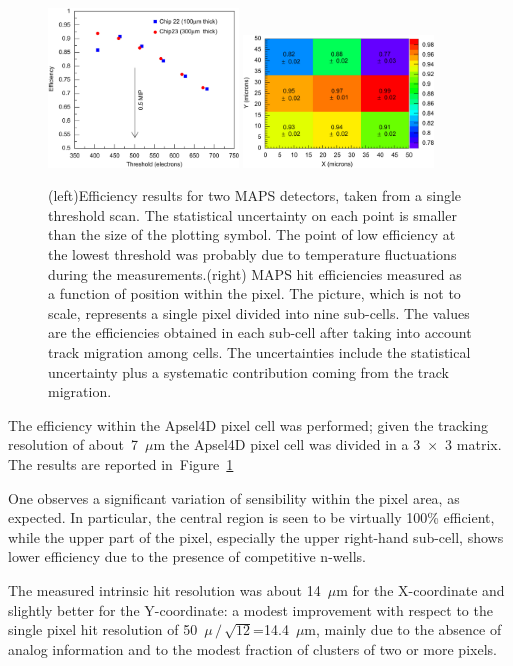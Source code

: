 \begin{figure}[!htpb]
\centering
\includegraphics[width=0.45\textwidth]{maps_eff.jpg}
\includegraphics[width=0.45\textwidth]{maps_res.jpg}
\caption{\label{fig:maps_eff}(left)Efficiency results for two MAPS detectors, taken from a single threshold 
scan. The statistical uncertainty on each point is smaller than the size of the plotting symbol. The point 
of low efficiency at the lowest threshold was probably due to temperature fluctuations during the 
measurements.(right) MAPS hit efficiencies measured as a function of position within the pixel. The picture, which is not to scale, represents a single pixel divided into nine sub-cells. The values are the efficiencies obtained in each sub-cell after taking into account track migration among cells. The uncertainties include the statistical uncertainty plus a systematic contribution coming from the track migration.}
\end{figure}
The efficiency within the Apsel4D pixel cell was performed; given the tracking resolution 
of about~7~$\mu$m the Apsel4D pixel cell was divided in a 3~$\times$~3 matrix. The results 
are reported in~Figure~\ref{fig:maps_eff}


One observes a significant variation of sensibility within the pixel area, as expected. In particular, the central region is seen to be virtually 100\% efficient, while the upper part of the pixel, especially the upper right-hand sub-cell, shows lower efficiency due to the presence of competitive n-wells.

The measured intrinsic hit resolution was about 14~$\mu$m for the X-coordinate and slightly better 
for the Y-coordinate: a modest improvement with respect to the single pixel hit resolution of 
50~$\mu\,/\,\sqrt{12}$=14.4~$\mu$m, mainly due 
to the absence of analog information and to the modest fraction of clusters of two or more pixels.


